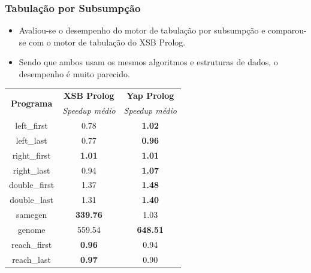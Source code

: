 \documentclass{beamer}
\begin{document}
\begin{frame}
   \frametitle{Tabulação por Subsumpção}
   \begin{itemize}
      \item Avaliou-se o desempenho do motor de tabulação por subsumpção e comparou-se com
      o motor de tabulação do XSB Prolog.
      \item Sendo que ambos usam os mesmos algoritmos e estruturas de dados, o desempenho é muito
      parecido.
   \end{itemize}
   {\footnotesize
   \begin{center}
     \begin{tabular}{ccc}
      \hline
       \hline
       \multirow{2}{*}{\textbf{Programa}} & \textbf{XSB Prolog} & \textbf{Yap Prolog} \\
       & \textit{\small{Speedup médio}} & \textit{\small{Speedup médio}} \\
      \hline
      \hline
   left\_first & 0.78 & \textbf{1.02} \\
   left\_last & 0.77  & \textbf{0.96} \\
   right\_first & \textbf{1.01} & \textbf{1.01} \\
   right\_last & 0.94 & \textbf{1.07} \\
   double\_first & 1.37 & \textbf{1.48} \\
   double\_last & 1.31 & \textbf{1.40} \\
   samegen & \textbf{339.76} & 1.03 \\
   genome & 559.54 & \textbf{648.51} \\
   reach\_first  & \textbf{0.96} & 0.94 \\
   reach\_last  & \textbf{0.97} & 0.90 \\
   \hline
   \hline
   \end{tabular}
   \end{center}}
\end{frame}
\end{document}

